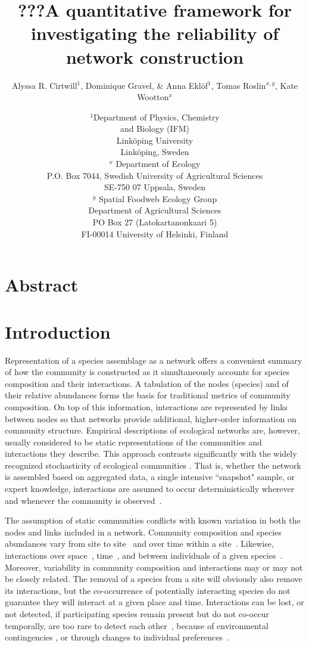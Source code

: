 \documentclass[12pt]{article}
\title{???A quantitative framework for investigating the reliability of network construction}
\author{Alyssa R. Cirtwill$^{1}$, Dominique Gravel, \&  Anna Ekl\"{o}f$^{1}$, Tomas Roslin$^{x,y}$, Kate Wootton$^{x}$}
\date{\small$^1$Department of Physics, Chemistry\\ 
and Biology (IFM)\\ 
Link\"{o}ping University\\
Link\"{o}ping, Sweden\\
\medskip $^x$ Department of Ecology\\ P.O. Box 7044, Swedish University of Agricultural Sciences \\ SE-750 07 Uppsala, Sweden \\
\medskip $^y$ Spatial Foodweb Ecology Group\\ Department of Agricultural Sciences \\ PO Box 27 (Latokartanonkaari 5)\\ FI-00014 University of Helsinki, Finland \\
}
\begin{document}
 
\maketitle 
\raggedright
\setlength{\parindent}{15pt} 


\section*{Abstract}



\section*{Introduction}

    Representation of a species assemblage as a network offers a convenient summary of how the community is constructed as it simultaneously accounts for species composition and their interactions. A tabulation of the nodes (species) and of their relative abundances forms the basis for traditional metrics of community composition. On top of this information, interactions are represented by links between nodes so that networks provide additional, higher-order information on community structure. Empirical descriptions of ecological networks are, however, usually considered to be static representations of the communities and interactions they describe. This approach contrasts significantly with the widely recognized stochasticity of ecological communities \citep{Gotelli2000}. That is, whether the network is assembled based on aggregated data, a single intensive ``snapshot" sample, or expert knowledge, interactions are assumed to occur deterministically wherever and whenever the community is observed~\citep{Olesen2011a}. 


    The assumption of static communities conflicts with known variation in both  the nodes and links included in a network. Community composition and species abundances vary from site to site~\citep{Baiser2012} and over time within a site~\citep{Olesen2011a}. Likewise, interactions over space~\citep{Kitching1987,Baiser2012}, time~\citep{Kitching1987,Olesen2011a}, and between individuals of a given species~\citep{Pires2011a,Fodrie2015,Novak2015}. Moreover, variability in community composition and interactions may or may not be closely related. The removal of a species from a site will obviously also remove its interactions, but the co-occurrence of potentially interacting species do not guarantee they will interact at a given place and time. Interactions can be lost, or not detected, if participating species remain present but do not co-occur temporally, are too rare to detect each other~\citep{Tylianakis2010}, because of environmental contingencies \citep{Poisot2015a}, or through changes to individual preferences~\citep{Fodrie2015}. 
\end{document}
